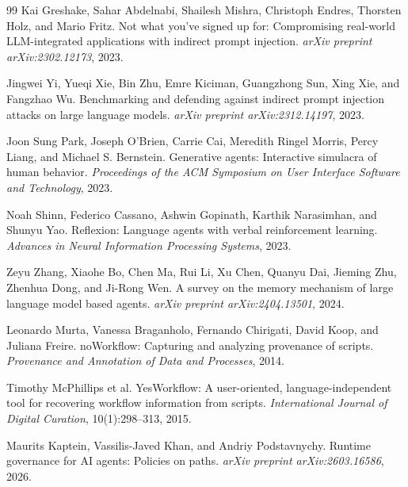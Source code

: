 \documentclass[sigconf,nonacm]{acmart}
\begin{document}
\begin{thebibliography}{99}
Kai Greshake, Sahar Abdelnabi, Shailesh Mishra, Christoph Endres, Thorsten Holz, and Mario Fritz.
\newblock Not what you've signed up for: Compromising real-world LLM-integrated applications with indirect prompt injection.
\newblock \emph{arXiv preprint arXiv:2302.12173}, 2023.

Jingwei Yi, Yueqi Xie, Bin Zhu, Emre Kiciman, Guangzhong Sun, Xing Xie, and Fangzhao Wu.
\newblock Benchmarking and defending against indirect prompt injection attacks on large language models.
\newblock \emph{arXiv preprint arXiv:2312.14197}, 2023.

Joon Sung Park, Joseph O'Brien, Carrie Cai, Meredith Ringel Morris, Percy Liang, and Michael S. Bernstein.
\newblock Generative agents: Interactive simulacra of human behavior.
\newblock \emph{Proceedings of the ACM Symposium on User Interface Software and Technology}, 2023.

Noah Shinn, Federico Cassano, Ashwin Gopinath, Karthik Narasimhan, and Shunyu Yao.
\newblock Reflexion: Language agents with verbal reinforcement learning.
\newblock \emph{Advances in Neural Information Processing Systems}, 2023.

Zeyu Zhang, Xiaohe Bo, Chen Ma, Rui Li, Xu Chen, Quanyu Dai, Jieming Zhu, Zhenhua Dong, and Ji-Rong Wen.
\newblock A survey on the memory mechanism of large language model based agents.
\newblock \emph{arXiv preprint arXiv:2404.13501}, 2024.

Leonardo Murta, Vanessa Braganholo, Fernando Chirigati, David Koop, and Juliana Freire.
\newblock noWorkflow: Capturing and analyzing provenance of scripts.
\newblock \emph{Provenance and Annotation of Data and Processes}, 2014.

Timothy McPhillips et al.
\newblock YesWorkflow: A user-oriented, language-independent tool for recovering workflow information from scripts.
\newblock \emph{International Journal of Digital Curation}, 10(1):298--313, 2015.

Maurits Kaptein, Vassilis-Javed Khan, and Andriy Podstavnychy.
\newblock Runtime governance for AI agents: Policies on paths.
\newblock \emph{arXiv preprint arXiv:2603.16586}, 2026.

\end{thebibliography}
\end{document}
